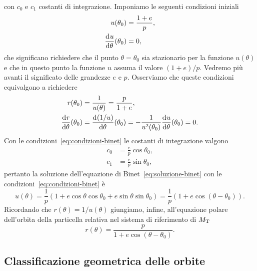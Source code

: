 con $c_0$ e $c_1$ costanti di integrazione. Imponiamo le seguenti condizioni
iniziali
\begin{subequations}
  \label{eq:condizioni-binet}
  \begin{align}
    u(\theta_0) &= \frac{1+e}{p},\\
    \frac{{\mathop{}\!\mathrm{d}^{}}u}{\mathop{}\!\mathrm{d} {\theta}^{}}(\theta_0) &= 0,
  \end{align}
\end{subequations}
che significano richiedere che il punto $\theta = \theta_0$ sia stazionario per
la funzione $u(\theta)$ e che in questo punto la funzione $u$ assuma il valore
$(1+e)/p$. Vedremo più avanti il significato delle grandezze $e$ e
$p$. Osserviamo che queste condizioni equivalgono a richiedere
\begin{subequations}
  \begin{align}
    r(\theta_0) &= \frac{1}{u(\theta)} = \frac{p}{1+e}, \\
    \frac{{\mathop{}\!\mathrm{d}^{}}r}{\mathop{}\!\mathrm{d} {\theta}^{}}(\theta_0) &= \frac{{\mathop{}\!\mathrm{d}^{}}(1/u)}{\mathop{}\!\mathrm{d} {\theta}^{}}(\theta_0) =
    -\frac{1}{u^2(\theta_0)} \frac{{\mathop{}\!\mathrm{d}^{}}u}{\mathop{}\!\mathrm{d} {\theta}^{}}(\theta_0) = 0.
  \end{align}
\end{subequations}
Con le condizioni~\eqref{eq:condizioni-binet} le costanti di integrazione
valgono
\begin{subequations}
  \label{eq:costanti-binet}
  \begin{align}
    c_0 &= \frac{e}{p}\cos\theta_0, \\
    c_1 &= \frac{e}{p}\sin\theta_0,
  \end{align}
\end{subequations}
pertanto la soluzione dell'equazione di Binet~\eqref{eq:soluzione-binet} con le
condizioni~\eqref{eq:condizioni-binet} è
\begin{equation}
  \label{eq:soluzione2-binet}
  u(\theta) = \frac{1}{p}(1 + e\cos\theta\cos\theta_0 +
  e\sin\theta\sin\theta_0) =  \frac{1}{p}(1+e\cos(\theta-\theta_0)).
\end{equation}
Ricordando che $r(\theta)=1/u(\theta)$ giungiamo, infine, all'equazione polare
dell'orbita della particella relativa nel sistema di riferimento di
$M_\textup{T}$
\begin{equation}
  \label{eq:orbita}
  r(\theta) = \frac{p}{1+e\cos(\theta-\theta_0)}.
\end{equation}

\subsection{Classificazione geometrica delle orbite}
\label{sec:class-geom-orbite}

